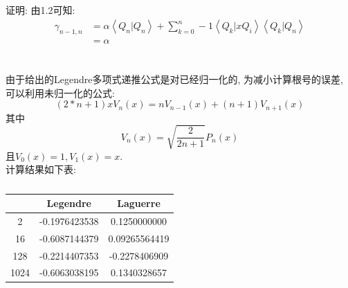 \documentclass[UTF8]{ctexart}
\begin{document}
        \subsection{}
            \indent 证明: 由1.2可知:
            \begin{equation}
                \begin{array}{ll}
                \gamma_{n-1, n}&=\alpha\left<Q_n|Q_n\right>+\sum\limits_{k=0}^n-1\left<Q_k|xQ_i\right>\left<Q_k|Q_n\right>\\
                &=\alpha
                \end{array}
            \end{equation}
    \section{}
        \subsection{}
            \indent 由于给出的Legendre多项式递推公式是对已经归一化的, 为减小计算根号的误差, 可以利用未归一化的公式:
            \begin{equation}
                (2*n+1)xV_n(x)=nV_{n-1}(x)+(n+1)V_{n+1}(x)
            \end{equation}
            其中
            \begin{equation}
                V_n(x)=\sqrt{\dfrac{2}{2n+1}}P_n(x)
            \end{equation}
            且$V_0(x)=1,V_1(x)=x$.\\
            \indent 计算结果如下表:
            \begin{table}[H]
                \centering
                \caption{}
                \begin{tabular}{|c|c|c|}
                    \hline
                    &Legendre&Laguerre\\
                    \hline
                    2&-0.1976423538&0.1250000000\\
                    \hline
                    16&-0.6087144379&0.09265564419\\
                    \hline
                    128&-0.2214407353&-0.2278406909\\
                    \hline
                    1024&-0.6063038195&0.1340328657\\
                    \hline
                \end{tabular}
            \end{table}
\end{document}
